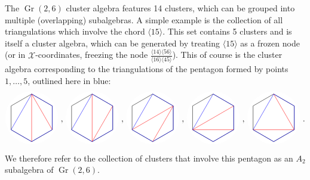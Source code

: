 \documentclass[12pt]{article}
\DeclareMathOperator{\Gr}{Gr}
\def\ket#1{\langle #1 \rangle}
\def\xcoords{$\mathcal{X}$-coordinates}
\def\drawHexagon{
\coordinate (P1) at (90:1);
\coordinate (P2) at (30:1);
\coordinate (P3) at (330:1);
\coordinate (P4) at (270:1);
\coordinate (P5) at (210:1);
\coordinate (P6) at (150:1);
\draw[white,fill=white] (0,0) circle (1.1cm);
\draw (P1) -- (P2) -- (P3) -- (P4) -- (P5) -- (P6) -- cycle;
}
\begin{document}
The $\Gr(2,6)$ cluster algebra features 14 clusters, which can be grouped into multiple (overlapping) subalgebras. A simple example is the collection of all triangulations which involve the chord $\ket{15}$. This set contains 5 clusters and is itself a cluster algebra, which can be generated by treating $\ket{15}$ as a frozen node (or in \xcoords, freezing the node $\frac{\ket{14}\ket{56}}{\ket{16}\ket{45}}$). This of course is the cluster algebra corresponding to the triangulations of the pentagon formed by points $1,\ldots,5$, outlined here in blue:
\begin{equation}
\begin{gathered}
\begin{tikzpicture}
	\drawHexagon
  	\draw[color=red] (P1) -- (P3);
  	\draw[color=red] (P1) -- (P4);
	\draw[color=blue] (P1) -- (P2) -- (P3) -- (P4) -- (P5) -- cycle;
\end{tikzpicture} 
\end{gathered}
{\ ,\ }
\begin{gathered}
\begin{tikzpicture}
	\begin{scope}[xshift=2cm]
	\drawHexagon
  	\draw[color=red] (P2) -- (P4);
  	\draw[color=red] (P1) -- (P4);
	\draw[color=blue] (P1) -- (P2) -- (P3) -- (P4) -- (P5) -- cycle;
	\end{scope}
\end{tikzpicture} 
\end{gathered}
{\ ,\ }
\begin{gathered}
\begin{tikzpicture}
	\begin{scope}[xshift=4cm]
	\drawHexagon
  	\draw[color=red] (P2) -- (P4);
  	\draw[color=red] (P2) -- (P5);
	\draw[color=blue] (P1) -- (P2) -- (P3) -- (P4) -- (P5) -- cycle;
	\end{scope}
\end{tikzpicture} 
\end{gathered}
{\ ,\ }
\begin{gathered}
\begin{tikzpicture}
	\begin{scope}[xshift=6cm]
	\drawHexagon
  	\draw[color=red] (P2) -- (P5);
  	\draw[color=red] (P3) -- (P5);
	\draw[color=blue] (P1) -- (P2) -- (P3) -- (P4) -- (P5) -- cycle;
	\end{scope}
\end{tikzpicture} 
\end{gathered}
{\ ,\ }
\begin{gathered}
\begin{tikzpicture}
	\begin{scope}[xshift=8cm]
	\drawHexagon
  	\draw[color=red] (P1) -- (P3);
  	\draw[color=red] (P3) -- (P5);
	\draw[color=blue] (P1) -- (P2) -- (P3) -- (P4) -- (P5) -- cycle;
	\end{scope}
\end{tikzpicture}
\end{gathered}\ .
\end{equation}
We therefore refer to the collection of clusters that involve this pentagon as an $A_2$ subalgebra of $\Gr(2,6)$. 
\end{document}
